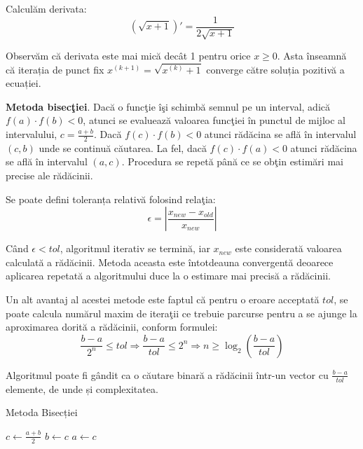 \documentclass{exam}
\begin{document}
Calculăm derivata:
\begin{equation*}
	(\sqrt{x + 1})' = \frac{1}{2\sqrt{x + 1}}
\end{equation*}

Observăm că derivata este mai mică decât 1 pentru orice $x \geq 0$. Asta
înseamnă că iterația de punct fix $x^{(k + 1)} = \sqrt{x^{(k)} + 1}$ converge
către soluția pozitivă a ecuației.

\textbf{Metoda bisecţiei}. Dacă o funcţie îşi schimbă semnul pe un interval,
adică $f(a)\cdot f(b)<0$, atunci se evaluează valoarea funcţiei în punctul de
mijloc al intervalului, $c = \frac{a + b}{2}$. Dacă  $f(c)\cdot f(b)<0$ atunci
rădăcina se află în intervalul $(c, b)$ unde se continuă căutarea. La fel, dacă
$f(c)\cdot f(a)<0$ atunci rădăcina se află în intervalul $(a, c)$. Procedura se
repetă până ce se obţin estimări mai precise ale rădăcinii.

Se poate defini toleranța relativă folosind relaţia:
\begin{equation*}
	\epsilon = \left | \frac{x_{new}-x_{old}}{x_{new}} \right |
\end{equation*}

Când $\epsilon < tol$, algoritmul iterativ se termină, iar $x_{new}$ este
considerată valoarea calculată a rădăcinii. Metoda aceasta este întotdeauna
convergentă deoarece aplicarea repetată a algoritmului duce la o estimare mai
precisă a rădăcinii.

Un alt avantaj al acestei metode este faptul că pentru o eroare acceptată $tol$,
se poate calcula numărul maxim de iteraţii ce trebuie parcurse pentru a se
ajunge la aproximarea dorită a rădăcinii, conform formulei:
\begin{equation*}
	\frac{b-a}{2^n} \leq tol \Rightarrow \frac{b-a}{tol} \leq 2^n \Rightarrow n \geq \log_{2}(\frac{b-a}{tol})
\end{equation*}

Algoritmul poate fi gândit ca o căutare binară a rădăcinii într-un vector cu
$\frac{b-a}{tol}$ elemente, de unde și complexitatea.

\begin{algorithm}
	\caption{Metoda Bisecției}
	\begin{algorithmic}[1]
		\State $c \gets \frac{a + b}{2}$
		\State $b \gets c$
		\Else
		\State $a \gets c$
		\EndIf
		\EndWhile
	\end{algorithmic}
\end{algorithm}
\end{document}
